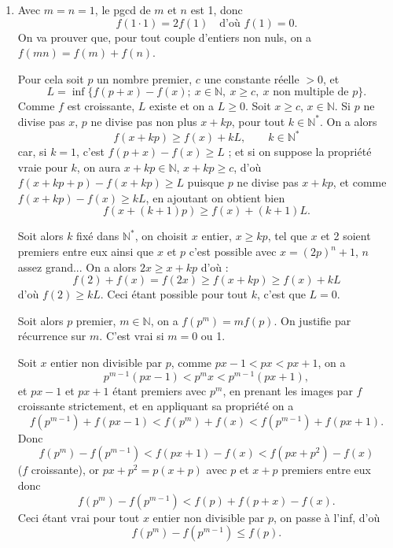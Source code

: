 \begin{enumerate}[label=\arabic*.,leftmargin=2.2em,itemsep=1.2em]
Mais alors la forme quadratique de matrice symétrique $T{}^tT$ est définie positive, (voir Ch. XI) : la matrice est de rang $n$. Ce rang est aussi $\dim(T({}^tT(\mathbb R^n)))$, car ${}^tT$ est linéaire de $\mathbb R^n$ dans $\mathbb R^m$, donc ${}^tT(\mathbb R^n)$ est de dimension inférieure à $m$, son image par $T$ et a fortiori de dimension inférieure à $m$, donc $n\le m$.

\item Avec $m=n=1$, le pgcd de $m$ et $n$ est 1, donc
\[
f(1\cdot1)=2f(1)\quad\text{d'où }f(1)=0.
\]
On va prouver que, pour tout couple d'entiers non nuls, on a $f(mn)=f(m)+f(n)$.

Pour cela soit $p$ un nombre premier, $c$ une constante réelle $>0$, et
\[
L=\inf\{f(p+x)-f(x);\ x\in\mathbb N,\ x\ge c,\ x\text{ non multiple de }p\}.
\]
Comme $f$ est croissante, $L$ existe et on a $L\ge0$. Soit $x\ge c$, $x\in\mathbb N$. Si $p$ ne divise pas $x$, $p$ ne divise pas non plus $x+kp$, pour tout $k\in\mathbb N^*$. On a alors
\[
f(x+kp)\ge f(x)+kL,\qquad k\in\mathbb N^*
\]
car, si $k=1$, c'est $f(p+x)-f(x)\ge L$ ; et si on suppose la propriété vraie pour $k$, on aura $x+kp\in\mathbb N$, $x+kp\ge c$, d'où $f(x+kp+p)-f(x+kp)\ge L$ puisque $p$ ne divise pas $x+kp$, et comme $f(x+kp)-f(x)\ge kL$, en ajoutant on obtient bien
\[
f(x+(k+1)p)\ge f(x)+(k+1)L.
\]

Soit alors $k$ fixé dans $\mathbb N^*$, on choisit $x$ entier, $x\ge kp$, tel que $x$ et 2 soient premiers entre eux ainsi que $x$ et $p$ c'est possible avec $x=(2p)^n+1$, $n$ assez grand... On a alors $2x\ge x+kp$ d'où :
\[
f(2)+f(x)=f(2x)\ge f(x+kp)\ge f(x)+kL
\]
d'où $f(2)\ge kL$. Ceci étant possible pour tout $k$, c'est que $L=0$.

Soit alors $p$ premier, $m\in\mathbb N$, on a $f(p^m)=mf(p)$. On justifie par récurrence sur $m$. C'est vrai si $m=0$ ou 1.

Soit $x$ entier non divisible par $p$, comme $px-1<px<px+1$, on a
\[
p^{m-1}(px-1)<p^mx<p^{m-1}(px+1),
\]
et $px-1$ et $px+1$ étant premiers avec $p^m$, en prenant les images par $f$ croissante strictement, et en appliquant sa propriété on a
\[
f(p^{m-1})+f(px-1)<f(p^m)+f(x)<f(p^{m-1})+f(px+1).
\]
Donc
\[
f(p^m)-f(p^{m-1})<f(px+1)-f(x)<f(px+p^2)-f(x)
\]
($f$ croissante), or $px+p^2=p(x+p)$ avec $p$ et $x+p$ premiers entre eux donc
\[
f(p^m)-f(p^{m-1})<f(p)+f(p+x)-f(x).
\]
Ceci étant vrai pour tout $x$ entier non divisible par $p$, on passe à l'inf, d'où
\[
f(p^m)-f(p^{m-1})\le f(p).
\]


\end{enumerate}
